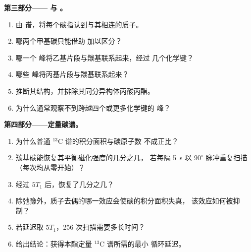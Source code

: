 \begin{problem}
\medskip\noindent\textbf{第三部分—— 与 。}
\begin{enumerate}[resume]
  \item 由  谱，将每个碳指认到与其相连的质子。
  \item 哪两个甲基碳只能借助  加以区分？
  \item 哪一个  峰将乙基片段与羰基联系起来，经过
        几个化学键？
  \item 哪些  峰将丙基片段与羰基联系起来？
  \item 推断其结构，并排除其同分异构体丙酸丙酯。
  \item 为什么通常观察不到跨越四个或更多化学键的  峰？
\end{enumerate}

\medskip\noindent\textbf{第四部分——定量碳谱。}
\begin{enumerate}[resume]
  \item 为什么普通 ${}^{13}$C 谱的积分面积与碳原子数
        不成正比？
  \item 羰基碳能恢复其平衡磁化强度的几分之几，
        若每隔 \qty{5}{s} 以 $90^\circ$ 脉冲重复扫描
        （每次均从零开始）？
  \item 经过 $5T_1$ 后，恢复了几分之几？
  \item 除弛豫外，质子去偶的哪一效应会使碳的积分面积失真，
        该效应如何被抑制？
  \item 若延迟取 $5T_1$，256 次扫描需要多长时间？
  \item 给出结论：获得本酯定量 ${}^{13}$C 谱所需的最小
        循环延迟。
\end{enumerate}
\end{problem}
